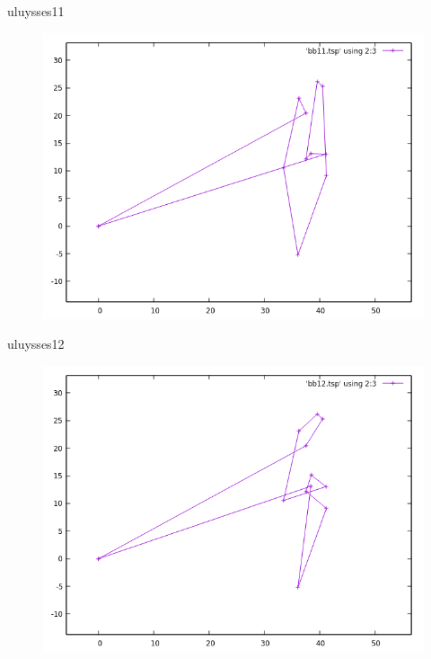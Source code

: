 \documentclass{beamer}
\begin{document}
\begin{frame}[fragile]{uluysses11}
\begin{figure}[H]
\centering
\includegraphics[scale=0.5]{bb11.png}
\end{figure}
\end{frame}

\begin{frame}[fragile]{uluysses12}
\begin{figure}[H]
\centering
\includegraphics[scale=0.5]{bb12.png}
\end{figure}
\end{frame}
\end{document}

